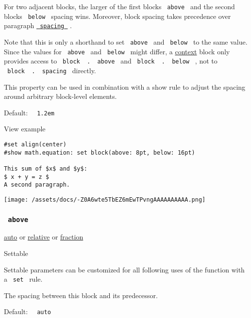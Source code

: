 For two adjacent blocks, the larger of the first block\textquotesingle s
\texttt{\ above\ } and the second block\textquotesingle s
\texttt{\ below\ } spacing wins. Moreover, block spacing takes
precedence over paragraph
\href{/docs/reference/model/par/\#parameters-spacing}{\texttt{\ spacing\ }}
.

Note that this is only a shorthand to set \texttt{\ above\ } and
\texttt{\ below\ } to the same value. Since the values for
\texttt{\ above\ } and \texttt{\ below\ } might differ, a
\href{/docs/reference/context/}{context} block only provides access to
\texttt{\ block\ }{\texttt{\ .\ }}\texttt{\ above\ } and
\texttt{\ block\ }{\texttt{\ .\ }}\texttt{\ below\ } , not to
\texttt{\ block\ }{\texttt{\ .\ }}\texttt{\ spacing\ } directly.

This property can be used in combination with a show rule to adjust the
spacing around arbitrary block-level elements.

Default: \texttt{\ }{\texttt{\ 1.2em\ }}\texttt{\ }


View example

\begin{verbatim}
#set align(center)
#show math.equation: set block(above: 8pt, below: 16pt)

This sum of $x$ and $y$:
$ x + y = z $
A second paragraph.
\end{verbatim}

\texttt{[image: /assets/docs/-Z0A6wte5TbEZ6mEwTPvngAAAAAAAAAA.png]}

\subsubsection{\texorpdfstring{\texttt{\ above\ }}{ above }}\label{parameters-above}

\href{/docs/reference/foundations/auto/}{auto} {or}
\href{/docs/reference/layout/relative/}{relative} {or}
\href{/docs/reference/layout/fraction/}{fraction}

{{ Settable }}

\label{parameters-above-settable-tooltip}
Settable parameters can be customized for all following uses of the
function with a \texttt{\ set\ } rule.

The spacing between this block and its predecessor.

Default: \texttt{\ }{\texttt{\ auto\ }}\texttt{\ }


